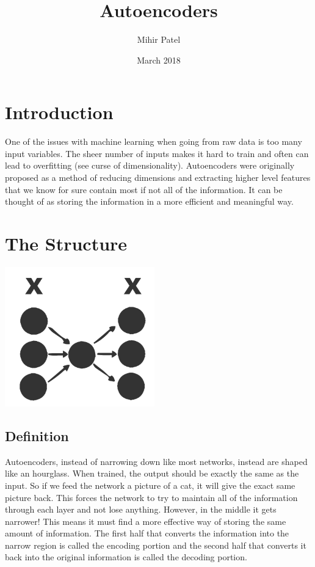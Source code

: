 \documentclass{article}
\title{Autoencoders}
\author{Mihir Patel}
\date{March 2018}
\begin{document}
\maketitle

\section{Introduction}
One of the issues with machine learning when going from raw data is too many input variables. The sheer number of inputs makes it hard to train and often can lead to overfitting (see curse of dimensionality). Autoencoders were originally proposed as a method of reducing dimensions and extracting higher level features that we know for sure contain most if not all of the information. It can be thought of as storing the information in a more efficient and meaningful way.

\section{The Structure}
\begin{center}
\includegraphics[scale=0.50]{autoencoders}
\end{center}
\subsection{Definition}
Autoencoders, instead of narrowing down like most networks, instead are shaped like an hourglass. When trained, the output should be exactly the same as the input. So if we feed the network a picture of a cat, it will give the exact same picture back. This forces the network to try to maintain all of the information through each layer and not lose anything. However, in the middle it gets narrower! This means it must find a more effective way of storing the same amount of information. The first half that converts the information into the narrow region is called the encoding portion and the second half that converts it back into the original information is called the decoding portion.
\end{document}
